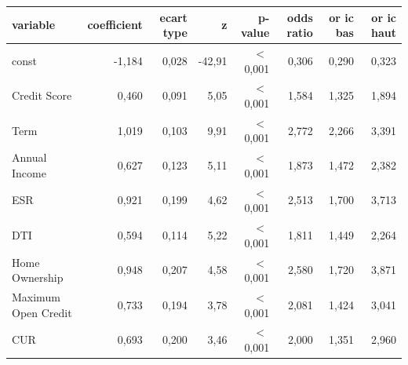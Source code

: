 \begin{tabular}{lrrrrrrr}
\toprule
\textbf{variable} & \textbf{coefficient} & \textbf{ecart type} & \textbf{z} & \textbf{p-value} & \textbf{odds ratio} & \textbf{or ic bas} & \textbf{or ic haut} \\
\midrule
const & -1,184 & 0,028 & -42,91 & $<$\,0,001 & 0,306 & 0,290 & 0,323 \\
Credit Score & 0,460 & 0,091 & 5,05 & $<$\,0,001 & 1,584 & 1,325 & 1,894 \\
Term & 1,019 & 0,103 & 9,91 & $<$\,0,001 & 2,772 & 2,266 & 3,391 \\
Annual Income & 0,627 & 0,123 & 5,11 & $<$\,0,001 & 1,873 & 1,472 & 2,382 \\
ESR & 0,921 & 0,199 & 4,62 & $<$\,0,001 & 2,513 & 1,700 & 3,713 \\
DTI & 0,594 & 0,114 & 5,22 & $<$\,0,001 & 1,811 & 1,449 & 2,264 \\
Home Ownership & 0,948 & 0,207 & 4,58 & $<$\,0,001 & 2,580 & 1,720 & 3,871 \\
Maximum Open Credit & 0,733 & 0,194 & 3,78 & $<$\,0,001 & 2,081 & 1,424 & 3,041 \\
CUR & 0,693 & 0,200 & 3,46 & $<$\,0,001 & 2,000 & 1,351 & 2,960 \\
\bottomrule
\end{tabular}
